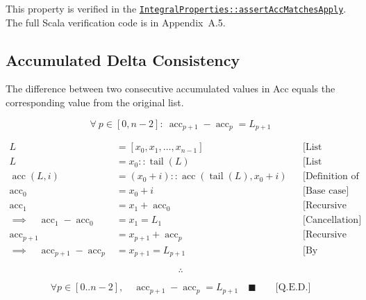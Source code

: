 {\raggedright
This property is verified in the
\href{https://github.com/thiagomata/prime-numbers/blob/master/src/main/scala/v1/chapter3/list/integral/properties/IntegralProperties.scala}{\texttt{IntegralProperties::\allowbreak assertAccMatchesApply}}.
The full Scala verification code is in Appendix~A.5.
\par}

\subsection{Accumulated Delta Consistency}
\label{sec:accumulated-delta-consistency}

The difference between two consecutive accumulated values in Acc equals
the corresponding value from the original list.

\begin{equation*}
\forall\ p \in [0, n-2]:\ \operatorname{acc}_{p+1} - \operatorname{acc}_p = L_{p+1}
\end{equation*}

\begin{equation*}
\begin{aligned}
L &= [x_0, x_1, \dots, x_{n-1} ]
  && \text{[List definition]} \\
L &= x_0 :: \operatorname{tail}(L)
  && \text{[List decomposition]} \\
\operatorname{acc}(L, i) &= (x_0 + i) :: \operatorname{acc}(\operatorname{tail}(L), x_0 + i)
  && \text{[Definition of acc]} \\
\operatorname{acc}_0 &= x_0 + i
  && \text{[Base case]} \\
\operatorname{acc}_1 &= x_1 + \operatorname{acc}_0
  && \text{[Recursive accumulation]} \\
\implies \quad \operatorname{acc}_1 - \operatorname{acc}_0 &= x_1 = L_1
  && \text{[Cancellation]} \\
\operatorname{acc}_{p+1} &= x_{p+1} + \operatorname{acc}_p
  && \text{[Recursive accumulation]} \\
\implies \quad \operatorname{acc}_{p+1} - \operatorname{acc}_p &= x_{p+1} = L_{p+1}
  && \text{[By subtraction]}
\end{aligned}
\end{equation*}

\begin{equation*}
\therefore
\end{equation*}

\begin{equation*}
\forall p \in [0..n-2],\quad \operatorname{acc}_{p+1} - \operatorname{acc}_p
  = L_{p+1} \quad \blacksquare \qquad \text{[Q.E.D.]}
\end{equation*}

